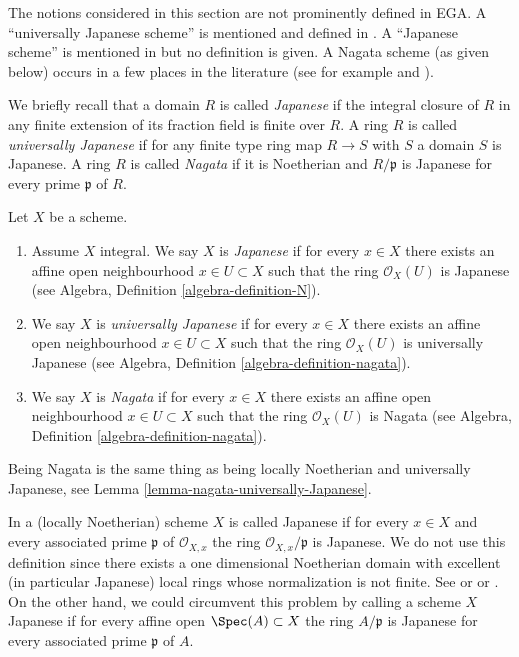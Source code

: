 \noindent
The notions considered in this section are not prominently defined in EGA.
A ``universally Japanese scheme'' is mentioned and defined in
\cite[IV Corollary 5.11.4]{EGA}. A ``Japanese scheme'' is mentioned in
\cite[IV Remark 10.4.14 (ii)]{EGA} but no definition is given.
A Nagata scheme (as given below) occurs in a few
places in the literature (see for example \cite[Definition 8.2.30]{Liu} and
\cite[Page 142]{Greco}).

\medskip\noindent
We briefly recall that a domain $R$ is called {\it Japanese} if the integral
closure of $R$ in any finite extension of its fraction field is finite over
$R$. A ring $R$ is called {\it universally Japanese} if for any finite type
ring map $R \to S$ with $S$ a domain $S$ is Japanese. A ring $R$ is called
{\it Nagata} if it is Noetherian and $R/\mathfrak p$ is Japanese for every
prime $\mathfrak p$ of $R$.

\begin{definition}
\label{definition-nagata}
Let $X$ be a scheme.
\begin{enumerate}
\item Assume $X$ integral. We say $X$ is {\it Japanese}
if for every $x \in X$ there exists an
affine open neighbourhood $x \in U \subset X$ such that the ring
$\mathcal{O}_X(U)$ is Japanese (see
Algebra, Definition \ref{algebra-definition-N}).
\item We say $X$ is {\it universally Japanese} if for every $x \in X$
there exists an affine open neighbourhood $x \in U \subset X$ such that
the ring $\mathcal{O}_X(U)$ is universally Japanese (see
Algebra, Definition \ref{algebra-definition-nagata}).
\item We say $X$ is {\it Nagata} if for every $x \in X$ there exists an
affine open neighbourhood $x \in U \subset X$ such that the ring
$\mathcal{O}_X(U)$ is Nagata (see
Algebra, Definition \ref{algebra-definition-nagata}).
\end{enumerate}
\end{definition}

\noindent
Being Nagata is the same thing as being locally Noetherian
and universally Japanese, see
Lemma \ref{lemma-nagata-universally-Japanese}.

\begin{remark}
\label{remark-non-integral-Japanese}
In \cite{Hoobler-finite} a (locally Noetherian) scheme $X$ is called
Japanese if for every $x \in X$ and every associated prime $\mathfrak p$
of $\mathcal{O}_{X, x}$ the ring $\mathcal{O}_{X, x}/\mathfrak p$ is
Japanese. We do not use this definition since there exists a one
dimensional Noetherian domain with excellent (in particular
Japanese) local rings whose normalization is not finite. See
\cite[Example 1]{Hochster-loci} or \cite{Heinzer-Levy} or
\cite[Expos\'e XIX]{Traveaux}.
On the other hand, we could circumvent this problem by calling a scheme
$X$ Japanese if for every affine open $\Spec(A) \subset X$ the ring
$A/\mathfrak p$ is Japanese for every associated prime $\mathfrak p$ of $A$.
\end{remark}

